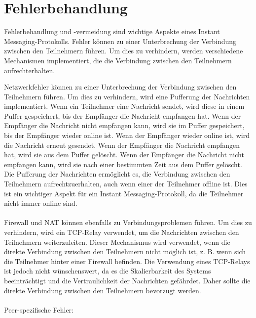 \section{Fehlerbehandlung}

Fehlerbehandlung und -vermeidung sind wichtige Aspekte eines Instant Messaging-Protokolls. Fehler können zu einer Unterbrechung der Verbindung zwischen den Teilnehmern führen. Um dies zu verhindern, werden verschiedene Mechanismen implementiert, die die Verbindung zwischen den Teilnehmern aufrechterhalten.

Netzwerkfehler können zu einer Unterbrechung der Verbindung zwischen den Teilnehmern führen. Um dies zu verhindern, wird eine Pufferung der Nachrichten implementiert. Wenn ein Teilnehmer eine Nachricht sendet, wird diese in einem Puffer gespeichert, bis der Empfänger die Nachricht empfangen hat. Wenn der Empfänger die Nachricht nicht empfangen kann, wird sie im Puffer gespeichert, bis der Empfänger wieder online ist. Wenn der Empfänger wieder online ist, wird die Nachricht erneut gesendet. Wenn der Empfänger die Nachricht empfangen hat, wird sie aus dem Puffer gelöscht. Wenn der Empfänger die Nachricht nicht empfangen kann, wird sie nach einer bestimmten Zeit aus dem Puffer gelöscht. Die Pufferung der Nachrichten ermöglicht es, die Verbindung zwischen den Teilnehmern aufrechtzuerhalten, auch wenn einer der Teilnehmer offline ist. Dies ist ein wichtiger Aspekt für ein Instant Messaging-Protokoll, da die Teilnehmer nicht immer online sind. 
\\
\\
Firewall und NAT können ebenfalls zu Verbindungsproblemen führen. Um dies zu verhindern, wird ein TCP-Relay verwendet, um die Nachrichten zwischen den Teilnehmern weiterzuleiten. Dieser Mechanismus wird verwendet, wenn die direkte Verbindung zwischen den Teilnehmern nicht möglich ist, z. B. wenn sich die Teilnehmer hinter einer Firewall befinden. Die Verwendung eines TCP-Relays ist jedoch nicht wünschenswert, da es die Skalierbarkeit des Systems beeinträchtigt und die Vertraulichkeit der Nachrichten gefährdet. Daher sollte die direkte Verbindung zwischen den Teilnehmern bevorzugt werden.
\\
\\
Peer-spezifische Fehler:
\\
\\
